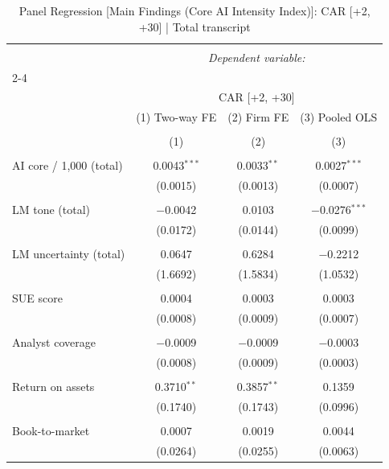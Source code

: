 
\begin{table}[!htbp] \centering 
  \caption{Panel Regression [Main Findings (Core AI Intensity Index)]: CAR [+2, +30]  |  Total transcript} 
  \label{} 
\begin{tabular}{@{\extracolsep{5pt}}lccc} 
\\[-1.8ex]\hline 
\hline \\[-1.8ex] 
 & \multicolumn{3}{c}{\textit{Dependent variable:}} \\ 
\cline{2-4} 
\\[-1.8ex] & \multicolumn{3}{c}{CAR [+2, +30]} \\ 
 & (1) Two-way FE & (2) Firm FE & (3) Pooled OLS \\ 
\\[-1.8ex] & (1) & (2) & (3)\\ 
\hline \\[-1.8ex] 
 AI core / 1,000 (total) & 0.0043$^{***}$ & 0.0033$^{**}$ & 0.0027$^{***}$ \\ 
  & (0.0015) & (0.0013) & (0.0007) \\ 
  & & & \\ 
 LM tone (total) & $-$0.0042 & 0.0103 & $-$0.0276$^{***}$ \\ 
  & (0.0172) & (0.0144) & (0.0099) \\ 
  & & & \\ 
 LM uncertainty (total) & 0.0647 & 0.6284 & $-$0.2212 \\ 
  & (1.6692) & (1.5834) & (1.0532) \\ 
  & & & \\ 
 SUE score & 0.0004 & 0.0003 & 0.0003 \\ 
  & (0.0008) & (0.0009) & (0.0007) \\ 
  & & & \\ 
 Analyst coverage & $-$0.0009 & $-$0.0009 & $-$0.0003 \\ 
  & (0.0008) & (0.0009) & (0.0003) \\ 
  & & & \\ 
 Return on assets & 0.3710$^{**}$ & 0.3857$^{**}$ & 0.1359 \\ 
  & (0.1740) & (0.1743) & (0.0996) \\ 
  & & & \\ 
 Book-to-market & 0.0007 & 0.0019 & 0.0044 \\ 
  & (0.0264) & (0.0255) & (0.0063) \\ 

\end{tabular}
\end{table}
